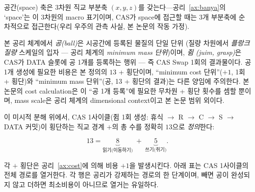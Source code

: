 \documentclass[entropy,article,submit,pdftex,oneauthor]{Definitions/mdpi}
\begin{document}
\begin{Definition}\label{lem:cost13}
공간(space) 축은 3차원 직교 부분축 $(x, y, z)$를 갖는다---공리~\ref{ax:banya}의 `space'는 이 3차원의 macro 표기이며, CAS가 space에 접근할 때는 3개 부분축에 순차적으로 접근한다(우리 우주의 관측 사실, 본 논문의 작동 가정).

본 공리 체계에서 \emph{공(ball)}은 시공간에 등록된 물질의 단일 단위 (질량 차원에서 \emph{플랑크 질량} 스케일의 입자 — 공리 체계의 \emph{minimum mass 단위})이며, \emph{쥠 (juim, grasp)}은 CAS가 DATA 슬롯에 공 1개를 등록하는 행위 — 즉 CAS Swap 1회의 결과물이다. 공 1개 생성에 필요한 비용은 본 정의의 $13$ + 횡단이며, ``minimum cost 단위''($+1$, 1회 + 횡단)와 ``minimum mass 단위''(공, 13 + 횡단의 결과)는 다른 양임에 주의한다. 본 논문의 cost calculation은 이 ``공 1개 등록''에 필요한 무차원 + 횡단 횟수를 셈할 뿐이며, mass scale은 공리 체계의 dimensional context이고 본 논문 범위 외이다.

이 미시적 분해 위에서, CAS 1사이클(쥠 1회 생성: 휴식 $\to$ R $\to$ C $\to$ S $\to$ DATA 커밋)이 횡단하는 직교 경계 $+$의 총 수를 정확히 $13$으로 \emph{정의}한다:
\begin{linenomath}
\begin{equation}
13 = \underbrace{8}_{\text{읽기(이동하기)}} \;+\; \underbrace{5}_{\text{쓰기(쥐기)}}.
\label{eq:cost13}
\end{equation}
\end{linenomath}
각 $+$ 횡단은 공리~\ref{ax:cost}에 의해 비용 $+1$을 발생시킨다. 아래 표는 CAS 1사이클의 전체 경로를 열거한다. 각 행은 공리가 강제하는 경로의 한 단계이며, 빼면 공이 완성되지 않고 더하면 최소비용이 아니므로 열거는 유일하다.


\end{Definition}
\end{document}

